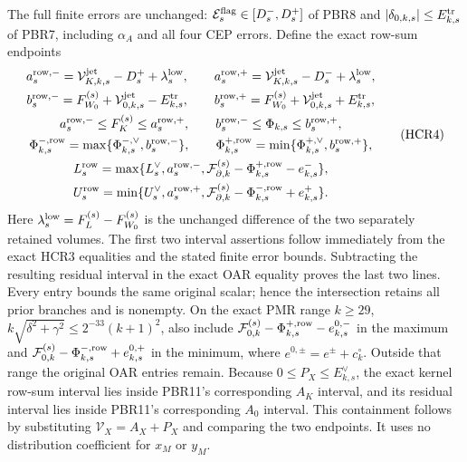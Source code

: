 \documentclass[11pt,a4paper]{article}
\begin{document}
The full finite errors are unchanged:
$\mathcal E_s^{\rm flag}\in[D_s^-,D_s^+]$ of PBR8 and
$|\delta_{0,k,s}|\le E_{k,s}^{\rm tr}$ of PBR7, including
$\alpha_A$ and all four CEP errors.
Define the exact row-sum endpoints
\[
\begin{gathered}
 a_s^{\rm row,-}=\mathcal V_{K,k,s}^{\rm jet}-D_s^+
                                      +\lambda_s^{\rm low},\qquad
 a_s^{\rm row,+}=\mathcal V_{K,k,s}^{\rm jet}-D_s^-
                                      +\lambda_s^{\rm low},\\
 b_s^{\rm row,-}=F_{W_0}^{(s)}+\mathcal V_{0,k,s}^{\rm jet}
                                      -E_{k,s}^{\rm tr},\qquad
 b_s^{\rm row,+}=F_{W_0}^{(s)}+\mathcal V_{0,k,s}^{\rm jet}
                                      +E_{k,s}^{\rm tr},\\
 a_s^{\rm row,-}\le F_K^{(s)}\le a_s^{\rm row,+},\qquad
 b_s^{\rm row,-}\le\Phi_{k,s}\le b_s^{\rm row,+},\\
 \Phi_{k,s}^{-,{\rm row}}
    =\max\{\Phi_{k,s}^{-,\vee},b_s^{\rm row,-}\},\qquad
 \Phi_{k,s}^{+,{\rm row}}
    =\min\{\Phi_{k,s}^{+,\vee},b_s^{\rm row,+}\},\\
 L_s^{\rm row}
   =\max\{L_s^\vee,a_s^{\rm row,-},
       \mathcal F_{\partial,k}^{(s)}
             -\Phi_{k,s}^{+,{\rm row}}-e_{k,s}^-\},\\
 U_s^{\rm row}
   =\min\{U_s^\vee,a_s^{\rm row,+},
       \mathcal F_{\partial,k}^{(s)}
             -\Phi_{k,s}^{-,{\rm row}}+e_{k,s}^+\}.
\end{gathered}\tag{HCR4}
\]
Here $\lambda_s^{\rm low}=F_L^{(s)}-F_{W_0}^{(s)}$ is the
unchanged difference of the two separately retained volumes.
The first two interval assertions follow immediately from
the exact HCR3 equalities and the stated finite error bounds.
Subtracting the resulting residual interval in the exact
OAR equality proves the last two lines.
Every entry bounds the same original scalar; hence the
intersection retains all prior branches and is nonempty.
On the exact PMR range $k\ge29$,
$k\sqrt{\delta^2+\gamma^2}\le2^{-33}(k+1)^2$, also include
$\mathcal F_{0,k}^{(s)}-\Phi_{k,s}^{+,{\rm row}}-e_{k,s}^{0,-}$
in the maximum and
$\mathcal F_{0,k}^{(s)}-\Phi_{k,s}^{-,{\rm row}}+e_{k,s}^{0,+}$
in the minimum, where $e^{0,\pm}=e^\pm+c_k^\circ$.
Outside that range the original OAR entries remain.
Because $0\le P_X\le E_{k,s}^{\vee}$, the exact kernel
row-sum interval lies inside PBR11's corresponding
$A_K$ interval, and its residual interval lies inside
PBR11's corresponding $A_0$ interval. This containment
follows by substituting $\mathcal V_X=A_X+P_X$ and
comparing the two endpoints. It uses no distribution
coefficient for $x_M$ or $y_M$.
\end{document}
